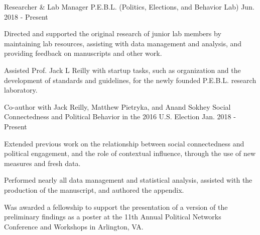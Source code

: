 

\begin{cventries}

    \cventry
      {Researcher \& Lab Manager} %
      {P.E.B.L. (Politics, Elections, and Behavior Lab)} %
      {Jun. 2018 - Present} %
      {} %
      {
        \begin{cvitems} %
          \item {Directed and supported the original research of junior lab members by maintaining lab resources, assisting with data management and analysis, and providing feedback on manuscripts and other work.}
          \item {Assisted Prof. Jack L Reilly with startup tasks, such as organization and the development of standards and guidelines, for the newly founded P.E.B.L. research laboratory.}
      \end{cvitems}
      }


    \cventry
      {Co-author with Jack Reilly, Matthew Pietryka, and Anand Sokhey} %
      {Social Connectedness and Political Behavior in the 2016 U.S. Election} %
      {Jan. 2018 - Present} %
      {} %
      {
        \begin{cvitems} %
          \item {Extended previous work on the relationship between social connectedness and political engagement, and the role of contextual influence, through the use of new measures and fresh data.}
          \item {Performed nearly all data management and statistical analysis, assisted with the production of the manuscript, and authored the appendix.}
          \item {Was awarded a fellowship to support the presentation of a version of the preliminary findings as a poster at the 11th Annual Political Networks Conference and Workshops in Arlington, VA.}
        \end{cvitems}
      }



\end{cventries}
